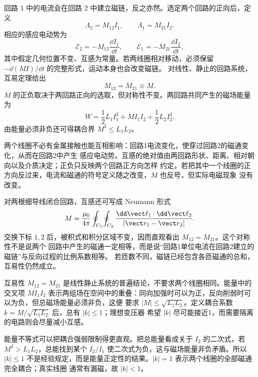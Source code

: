 回路 1 中的电流会在回路 2 中建立磁链，反之亦然。选定两个回路的正向后，定义
\begin{equation}
  \Lambda_2=M_{12}I_1,
  \qquad
  \Lambda_1=M_{21}I_2.
\end{equation}
相应的感应电动势为
\begin{equation}
  \mathcal E_2=-M_{12}\frac{\dd I_1}{\dd t},
  \qquad
  \mathcal E_1=-M_{21}\frac{\dd I_2}{\dd t},
\end{equation}
其中假定几何位置不变、互感为常量。若两线圈相对移动，必须保留
$-\dd(MI)/\dd t$ 的完整形式，运动本身也会改变磁链。
对线性、静止的回路系统，互易定理给出
\begin{equation}
  \boxed{M_{12}=M_{21}\equiv M}.
\end{equation}
$M$ 的正负取决于两回路正向的选取，但对称性不变。两回路共同产生的磁场能量为
\begin{equation}
  \boxed{W=\frac12L_1I_1^2+MI_1I_2+\frac12L_2I_2^2}.
\end{equation}
由能量必须非负还可得耦合界 $M^2\le L_1L_2$。

两个线圈不必有金属接触也能互相影响：回路1电流变化，使穿过回路2的磁通变化，从而在回路2中产生
感应电动势。互感的绝对值由两回路形状、距离、相对朝向以及介质决定；正负只反映两个回路正方向怎样
约定。若把其中一个线圈的正方向反过来，电流和磁通的符号定义随之改变，$M$ 也反号，但实际电磁现象
没有改变。

对两根细导线闭合回路，互感还可写成 Neumann 形式
\begin{equation}
  M=\frac{\mu_0}{4\pi}\oint_{C_1}\!\oint_{C_2}
  \frac{\dd\vect\ell_1\cdot\dd\vect\ell_2}{|\vect r_1-\vect r_2|}.
\end{equation}
交换下标 $1,2$ 后，被积式和积分区域不变，因而直观看出 $M_{12}=M_{21}$。这个对称性不是说两个
回路中产生的磁通一定相等，而是说“回路1单位电流在回路2建立的磁链”与反向过程的比例系数相等。
若匝数不同，磁链已经包含各匝磁通的总和，互易性仍然成立。

互易性 $M_{12}=M_{21}$ 是线性静止系统的普遍结论，不要求两个线圈相同。能量中的交叉项 $MI_1I_2$
表示两组场在空间中的重叠：同向加强时可以为正，反向削弱时可以为负，但总磁场能量必须非负，这便
要求 $|M|\le\sqrt{L_1L_2}$。定义耦合系数 $k=M/\sqrt{L_1L_2}$ 后，总有 $|k|\le1$；理想变压器
希望 $|k|$ 尽可能接近1，而需要隔离的电路则会尽量减小互感。

能量不等式可以把耦合强弱限制得更直观。把总能量看成关于 $I_2$ 的二次式，若
$M^2>L_1L_2$，总能找到某个 $I_2/I_1$ 使二次式为负，这与磁场能量非负矛盾。所以
$|k|\le1$ 不是经验规定，而是能量正定性的结果。$|k|=1$ 表示两个线圈的全部磁通完全耦合；真实线圈
通常有漏磁，故 $|k|<1$。

